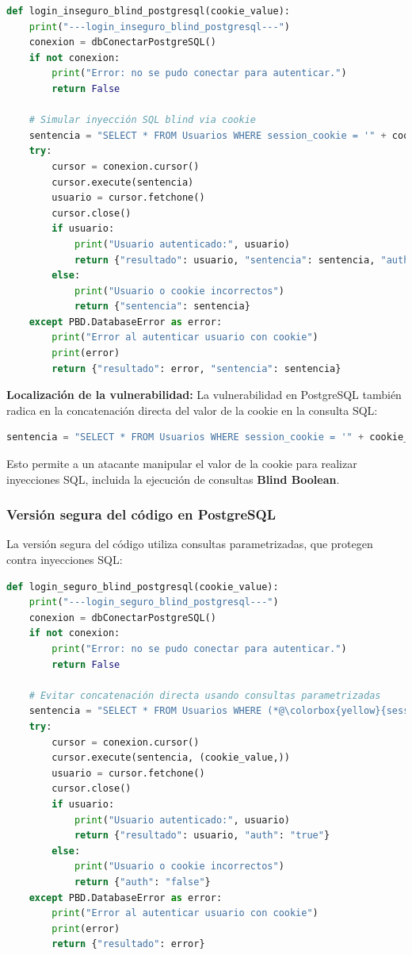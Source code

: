 \documentclass[a4paper,12pt]{article}
\begin{document}
\begin{lstlisting}[language=Python]
def login_inseguro_blind_postgresql(cookie_value):
    print("---login_inseguro_blind_postgresql---")
    conexion = dbConectarPostgreSQL()
    if not conexion:
        print("Error: no se pudo conectar para autenticar.")
        return False

    # Simular inyección SQL blind via cookie
    sentencia = "SELECT * FROM Usuarios WHERE session_cookie = '" + cookie_value + "'"
    try:
        cursor = conexion.cursor()
        cursor.execute(sentencia)
        usuario = cursor.fetchone()
        cursor.close()
        if usuario:
            print("Usuario autenticado:", usuario)
            return {"resultado": usuario, "sentencia": sentencia, "auth": "true"}
        else:
            print("Usuario o cookie incorrectos")
            return {"sentencia": sentencia}
    except PBD.DatabaseError as error:
        print("Error al autenticar usuario con cookie")
        print(error)
        return {"resultado": error, "sentencia": sentencia}
\end{lstlisting}

\textbf{Localización de la vulnerabilidad:} La vulnerabilidad en PostgreSQL también radica en la concatenación directa del valor de la cookie en la consulta SQL:

\begin{lstlisting}[language=Python]
sentencia = "SELECT * FROM Usuarios WHERE session_cookie = '" + cookie_value + "'"
\end{lstlisting}

Esto permite a un atacante manipular el valor de la cookie para realizar inyecciones SQL, incluida la ejecución de consultas \textbf{Blind Boolean}.

\subsubsection{Versión segura del código en PostgreSQL}

La versión segura del código utiliza consultas parametrizadas, que protegen contra inyecciones SQL:

\begin{lstlisting}[language=Python]
def login_seguro_blind_postgresql(cookie_value):
    print("---login_seguro_blind_postgresql---")
    conexion = dbConectarPostgreSQL()
    if not conexion:
        print("Error: no se pudo conectar para autenticar.")
        return False

    # Evitar concatenación directa usando consultas parametrizadas
    sentencia = "SELECT * FROM Usuarios WHERE (*@\colorbox{yellow}{session\_cookie = \%s}@*)"
    try:
        cursor = conexion.cursor()
        cursor.execute(sentencia, (cookie_value,))
        usuario = cursor.fetchone()
        cursor.close()
        if usuario:
            print("Usuario autenticado:", usuario)
            return {"resultado": usuario, "auth": "true"}
        else:
            print("Usuario o cookie incorrectos")
            return {"auth": "false"}
    except PBD.DatabaseError as error:
        print("Error al autenticar usuario con cookie")
        print(error)
        return {"resultado": error}
\end{lstlisting}
\end{document}
